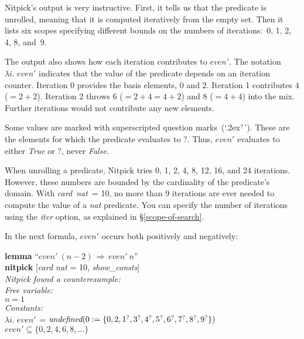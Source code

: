 \documentclass[a4paper,12pt]{article}
\def\undef{\textit{undefined}}
\def\unk{{?}}
\def\unr{\ldots}
\def\Q{{\smash{\lower.2ex\hbox{$\scriptstyle?$}}}}
\begin{document}
Nitpick's output is very instructive. First, it tells us that the predicate is
unrolled, meaning that it is computed iteratively from the empty set. Then it
lists six scopes specifying different bounds on the numbers of iterations:\ 0,
1, 2, 4, 8, and~9.

The output also shows how each iteration contributes to $\textit{even}'$. The
notation $\lambda i.\; \textit{even}'$ indicates that the value of the
predicate depends on an iteration counter. Iteration 0 provides the basis
elements, $0$ and $2$. Iteration 1 contributes $4$ ($= 2 + 2$). Iteration 2
throws $6$ ($= 2 + 4 = 4 + 2$) and $8$ ($= 4 + 4$) into the mix. Further
iterations would not contribute any new elements.

Some values are marked with superscripted question
marks~(`\lower.2ex\hbox{$^\Q$}'). These are the elements for which the
predicate evaluates to $\unk$. Thus, $\textit{even}'$ evaluates to either
\textit{True} or $\unk$, never \textit{False}.

When unrolling a predicate, Nitpick tries 0, 1, 2, 4, 8, 12, 16, and 24
iterations. However, these numbers are bounded by the cardinality of the
predicate's domain. With \textit{card~nat}~= 10, no more than 9 iterations are
ever needed to compute the value of a \textit{nat} predicate. You can specify
the number of iterations using the \textit{iter} option, as explained in
\S\ref{scope-of-search}.

In the next formula, $\textit{even}'$ occurs both positively and negatively:

\prew
\textbf{lemma} ``$\textit{even}'~(n - 2) \,\Longrightarrow\, \textit{even}'~n$'' \\
\textbf{nitpick} [\textit{card nat} = 10, \textit{show\_consts}] \\[2\smallskipamount]
\slshape Nitpick found a counterexample: \\[2\smallskipamount]
\hbox{}\qquad Free variable: \nopagebreak \\
\hbox{}\qquad\qquad $n = 1$ \\
\hbox{}\qquad Constants: \nopagebreak \\
\hbox{}\qquad\qquad $\lambda i.\; \textit{even}'$ = $\undef(\!\begin{aligned}[t]
& 0 := \{0, 2, 1^\Q, 3^\Q, 4^\Q, 5^\Q, 6^\Q, 7^\Q, 8^\Q, 9^\Q\})\end{aligned}$  \\
\hbox{}\qquad\qquad $\textit{even}' \subseteq \{0, 2, 4, 6, 8, \unr\}$
\postw
\end{document}
